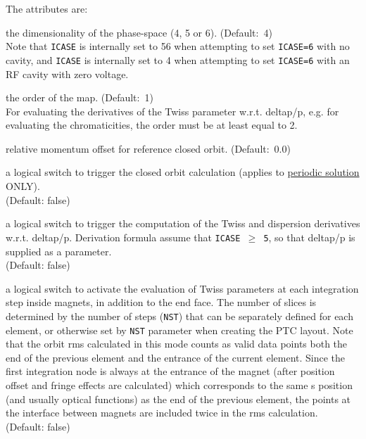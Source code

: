 The attributes are: 
\begin{madlist}

  the dimensionality of the phase-space (4, 5 or
  6). (Default:~4)\\ Note that \texttt{ICASE} is internally set to 56 when
  attempting to set \texttt{ICASE=6} with no cavity, and \texttt{ICASE} is
  internally set to 4 when attempting to set \texttt{ICASE=6} with an RF
  cavity with zero voltage.

  the order of the map. (Default:~1)\\ For evaluating the
  derivatives of the Twiss parameter w.r.t. deltap/p, e.g. for
  evaluating the chromaticities, the order must be at least equal to 2.

  relative momentum offset for reference closed orbit. (Default:~0.0) 

  a logical switch to trigger the closed orbit calculation
  (applies to \hyperref[sec:ptc-twiss-periodic]{periodic solution} ONLY). \\  
  (Default: false)

  a logical switch to trigger the computation of the Twiss and
  dispersion derivatives w.r.t. deltap/p. Derivation formula assume that
  \texttt{ICASE $\ge$ 5}, so that deltap/p is supplied as a parameter. \\
  (Default: false)

  a logical switch to activate the evaluation of Twiss parameters at each
  integration step inside magnets, in addition to the end face.  The
  number of slices is determined by the number of steps (\texttt{NST}) that
  can be separately defined for each element, or otherwise set by
  \texttt{NST} parameter when creating the PTC layout.  Note that the
  orbit  rms calculated in this mode counts as valid data points both
  the end of the previous element and the entrance of the current
  element. Since the first integration node is always at the entrance of
  the magnet (after position offset and fringe effects are calculated)
  which corresponds to the same s position (and usually optical
  functions) as the end of the previous element, the points at the
  interface between magnets are included twice in the rms calculation. \\ 
  (Default: false)


\end{madlist}
